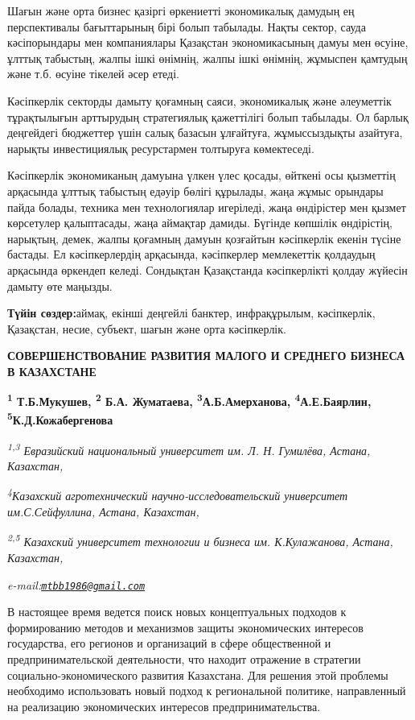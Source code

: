 Шағын және орта бизнес қазіргі өркениетті экономикалық дамудың ең
перспективалы бағыттарының бірі болып табылады. Нақты сектор, сауда
кәсіпорындары мен компаниялары Қазақстан экономикасының дамуы мен
өсуіне, ұлттық табыстың, жалпы ішкі өнімнің, жалпы ішкі өнімнің,
жұмыспен қамтудың және т.б. өсуіне тікелей әсер етеді.

Кәсіпкерлік секторды дамыту қоғамның саяси, экономикалық және әлеуметтік
тұрақтылығын арттырудың стратегиялық қажеттілігі болып табылады. Ол
барлық деңгейдегі бюджеттер үшін салық базасын ұлғайтуға, жұмыссыздықты
азайтуға, нарықты инвестициялық ресурстармен толтыруға көмектеседі.

Кәсіпкерлік экономиканың дамуына үлкен үлес қосады, өйткені осы
қызметтің арқасында ұлттық табыстың едәуір бөлігі құрылады, жаңа жұмыс
орындары пайда болады, техника мен технологиялар игеріледі, жаңа
өндірістер мен қызмет көрсетулер қалыптасады, жаңа аймақтар дамиды.
Бүгінде көпшілік өндірістің, нарықтың, демек, жалпы қоғамның дамуын
қозғайтын кәсіпкерлік екенін түсіне бастады. Ел кәсіпкерлердің
арқасында, кәсіпкерлер мемлекеттік қолдаудың арқасында өркендеп келеді.
Сондықтан Қазақстанда кәсіпкерлікті қолдау жүйесін дамыту өте маңызды.

{\bfseries Түйін сөздер:}аймақ, екінші деңгейлі банктер, инфрақұрылым,
кәсіпкерлік, Қазақстан, несие, субъект, шағын және орта кәсіпкерлік.

{\bfseries СОВЕРШЕНСТВОВАНИЕ РАЗВИТИЯ МАЛОГО И СРЕДНЕГО БИЗНЕСА В
КАЗАХСТАНЕ}

{\bfseries \textsuperscript{1} Т.Б.Мукушев\textsuperscript{\envelope },
\textsuperscript{2} Б.А. Жуматаева, \textsuperscript{3}А.Б.Амерханова,
\textsuperscript{4}А.Е.Баярлин, \textsuperscript{5}К.Д.Кожабергенова}

\emph{\textsuperscript{1,3} Евразийский национальный университет им. Л.
Н. Гумилёва, Астана, Казахстан,}

\emph{\textsuperscript{4}Казахский агротехнический
научно-исследовательский университет им.С.Сейфуллина, Астана,
Казахстан,}

\emph{\textsuperscript{2,5} Казахский университет технологии и бизнеса
им. К.Кулажанова, Астана, Казахстан,}

\emph{e-mail:\href{mailto:mtbb1986@gmail.com}{\nolinkurl{mtbb1986@gmail.com}}}

В настоящее время ведется поиск новых концептуальных подходов к
формированию методов и механизмов защиты экономических интересов
государства, его регионов и организаций в сфере общественной и
предпринимательской деятельности, что находит отражение в стратегии
социально-экономического развития Казахстана. Для решения этой проблемы
необходимо использовать новый подход к региональной политике,
направленный на реализацию экономических интересов предпринимательства.

